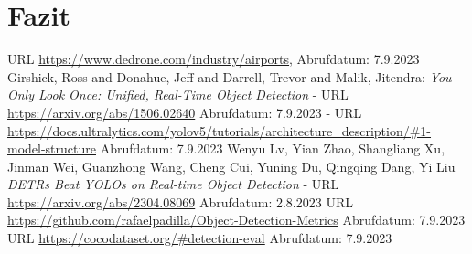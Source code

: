 \documentclass[runningheads]{llncs}
\begin{document}
\section{Fazit}

\begin{thebibliography}{3}

URL \url{https://www.dedrone.com/industry/airports}, Abrufdatum: 7.9.2023
Girshick, Ross and Donahue, Jeff and Darrell, Trevor and Malik, Jitendra: \textit{You Only Look Once: Unified, Real-Time Object Detection} 
 - URL \url{https://arxiv.org/abs/1506.02640}
 Abrufdatum: 7.9.2023
 - URL \url{ https://docs.ultralytics.com/yolov5/tutorials/architecture_description/#1-model-structure}
 Abrufdatum: 7.9.2023
 Wenyu Lv, Yian Zhao, Shangliang Xu, Jinman Wei, Guanzhong Wang, Cheng Cui, Yuning Du, Qingqing Dang, Yi Liu \textit{DETRs Beat YOLOs on Real-time Object Detection} 
  - URL \url{https://arxiv.org/abs/2304.08069}
 Abrufdatum: 2.8.2023
URL \url{https://github.com/rafaelpadilla/Object-Detection-Metrics}
Abrufdatum: 7.9.2023
 URL \url{https://cocodataset.org/\#detection-eval}
 Abrufdatum: 7.9.2023

\end{thebibliography}
\end{document}
